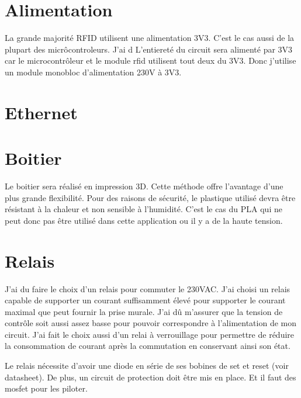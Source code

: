 \section{Alimentation}
La grande majorité RFID utilisent une alimentation 3V3. C'est le cas aussi de la plupart des micrôcontroleurs. J'ai d
L'entiereté du circuit sera alimenté par 3V3 car le microcontrôleur et le module rfid utilisent tout deux du 3V3. 
Donc j'utilise un module monobloc d'alimentation 230V à 3V3. 

\section{Ethernet}

\section{Boitier}
Le boitier sera réalisé en impression 3D. Cette méthode offre l'avantage d'une plus grande flexibilité.
Pour des raisons de sécurité, le plastique utilisé devra être résistant à la chaleur et non sensible à l'humidité. C'est le cas du PLA qui ne peut donc pas être utilisé dans cette application ou il y a de la haute tension.

\section{Relais}
J'ai du faire le choix d'un relais pour commuter le 230VAC. J'ai choisi un relais capable de supporter un courant suffisamment élevé pour supporter le courant maximal que peut fournir la prise murale. J'ai dû m'assurer que la tension de contrôle soit aussi assez basse pour pouvoir correspondre à l'alimentation de mon circuit.
J'ai fait le choix aussi d'un relai à verrouillage pour permettre de réduire la consommation de courant après la commutation en conservant ainsi son état.

Le relais nécessite d'avoir une diode en série de ses bobines de set et reset (voir datasheet).
De plus, un circuit de protection doit être mis en place. Et il faut des mosfet pour les piloter.

